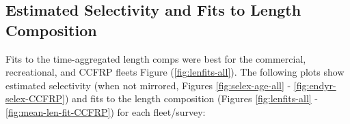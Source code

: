 \documentclass[11pt,
  english,
]{article}
\begin{document}

\hypertarget{estimated-selectivity-and-fits-to-length-composition}{%
\subsection{Estimated Selectivity and Fits to Length Composition}\label{estimated-selectivity-and-fits-to-length-composition}}

\leavevmode\tagmcend\tagstructend

Fits to the time-aggregated length comps were best for the commercial, recreational, and CCFRP fleets Figure (\ref{fig:lenfits-all}). The following plots show estimated selectivity (when not mirrored, Figures \ref{fig:selex-age-all} - \ref{fig:endyr-selex-CCFRP}) and fits to the length composition (Figures \ref{fig:lenfits-all} - \ref{fig:mean-len-fit-CCFRP}) for each fleet/survey:

\end{document}
